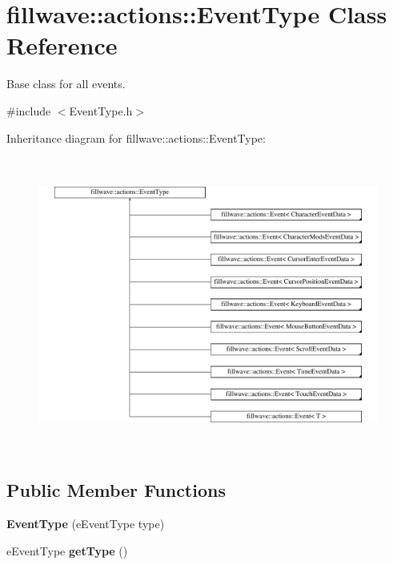 \hypertarget{classfillwave_1_1actions_1_1EventType}{}\section{fillwave\+:\+:actions\+:\+:Event\+Type Class Reference}
\label{classfillwave_1_1actions_1_1EventType}


Base class for all events.  




{\ttfamily \#include $<$Event\+Type.\+h$>$}

Inheritance diagram for fillwave\+:\+:actions\+:\+:Event\+Type\+:\begin{figure}[H]
\begin{center}
\leavevmode
\includegraphics[height=9.716088cm]{classfillwave_1_1actions_1_1EventType}
\end{center}
\end{figure}
\subsection*{Public Member Functions}
\begin{DoxyCompactItemize}
\item 
\hypertarget{classfillwave_1_1actions_1_1EventType_a221bb02b1f5c6e04695707ba47abd61b}{}{\bfseries Event\+Type} (e\+Event\+Type type)\label{classfillwave_1_1actions_1_1EventType_a221bb02b1f5c6e04695707ba47abd61b}

\item 
\hypertarget{classfillwave_1_1actions_1_1EventType_adf6612d2c6a3edd17f1cdd313355d62c}{}e\+Event\+Type {\bfseries get\+Type} ()\label{classfillwave_1_1actions_1_1EventType_adf6612d2c6a3edd17f1cdd313355d62c}

\end{DoxyCompactItemize}


